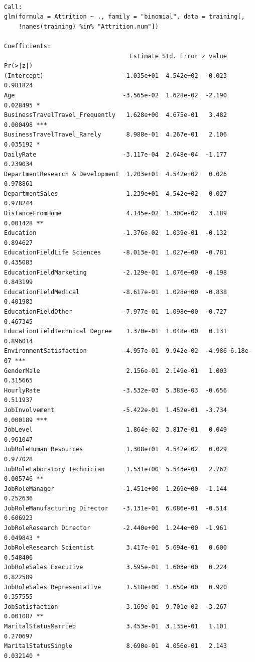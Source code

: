 \documentclass[
  letterpaper,
  DIV=11,
  numbers=noendperiod]{scrreprt}
\begin{document}
\begin{verbatim}

Call:
glm(formula = Attrition ~ ., family = "binomial", data = training[, 
    !names(training) %in% "Attrition.num"])

Coefficients:
                                   Estimate Std. Error z value Pr(>|z|)    
(Intercept)                      -1.035e+01  4.542e+02  -0.023 0.981824    
Age                              -3.565e-02  1.628e-02  -2.190 0.028495 *  
BusinessTravelTravel_Frequently   1.628e+00  4.675e-01   3.482 0.000498 ***
BusinessTravelTravel_Rarely       8.988e-01  4.267e-01   2.106 0.035192 *  
DailyRate                        -3.117e-04  2.648e-04  -1.177 0.239034    
DepartmentResearch & Development  1.203e+01  4.542e+02   0.026 0.978861    
DepartmentSales                   1.239e+01  4.542e+02   0.027 0.978244    
DistanceFromHome                  4.145e-02  1.300e-02   3.189 0.001428 ** 
Education                        -1.376e-02  1.039e-01  -0.132 0.894627    
EducationFieldLife Sciences      -8.013e-01  1.027e+00  -0.781 0.435083    
EducationFieldMarketing          -2.129e-01  1.076e+00  -0.198 0.843199    
EducationFieldMedical            -8.617e-01  1.028e+00  -0.838 0.401983    
EducationFieldOther              -7.977e-01  1.098e+00  -0.727 0.467345    
EducationFieldTechnical Degree    1.370e-01  1.048e+00   0.131 0.896014    
EnvironmentSatisfaction          -4.957e-01  9.942e-02  -4.986 6.18e-07 ***
GenderMale                        2.156e-01  2.149e-01   1.003 0.315665    
HourlyRate                       -3.532e-03  5.385e-03  -0.656 0.511937    
JobInvolvement                   -5.422e-01  1.452e-01  -3.734 0.000189 ***
JobLevel                          1.864e-02  3.817e-01   0.049 0.961047    
JobRoleHuman Resources            1.308e+01  4.542e+02   0.029 0.977028    
JobRoleLaboratory Technician      1.531e+00  5.543e-01   2.762 0.005746 ** 
JobRoleManager                   -1.451e+00  1.269e+00  -1.144 0.252636    
JobRoleManufacturing Director    -3.131e-01  6.086e-01  -0.514 0.606923    
JobRoleResearch Director         -2.440e+00  1.244e+00  -1.961 0.049843 *  
JobRoleResearch Scientist         3.417e-01  5.694e-01   0.600 0.548406    
JobRoleSales Executive            3.595e-01  1.603e+00   0.224 0.822589    
JobRoleSales Representative       1.518e+00  1.650e+00   0.920 0.357555    
JobSatisfaction                  -3.169e-01  9.701e-02  -3.267 0.001087 ** 
MaritalStatusMarried              3.453e-01  3.135e-01   1.101 0.270697    
MaritalStatusSingle               8.690e-01  4.056e-01   2.143 0.032140 *  

\end{verbatim}
\end{document}
